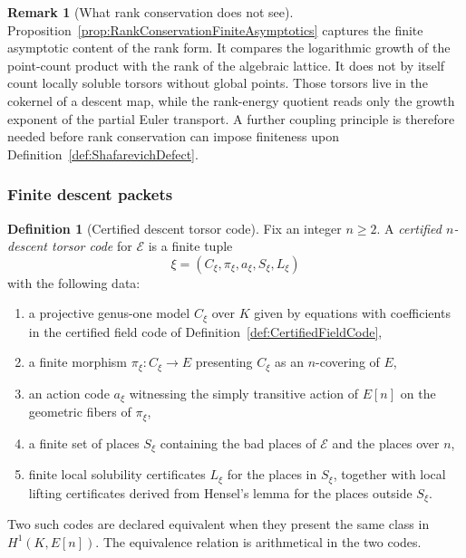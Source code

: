\documentclass[10pt, reqno]{amsart}
\theoremstyle{plain}
\theoremstyle{definition}
\newtheorem{definition}[theorem]{Definition}
\newtheorem{remark}[theorem]{Remark}
\theoremstyle{plain}
\begin{document}
\begin{remark}[What rank conservation does not see]
\label{rem:RankConservationDoesNotSeeSha}
Proposition~\ref{prop:RankConservationFiniteAsymptotics} captures the finite asymptotic content of the rank form. It compares the logarithmic growth of the point-count product with the rank of the algebraic lattice. It does not by itself count locally soluble torsors without global points. Those torsors live in the cokernel of a descent map, while the rank-energy quotient reads only the growth exponent of the partial Euler transport. A further coupling principle is therefore needed before rank conservation can impose finiteness upon Definition~\ref{def:ShafarevichDefect}.
\end{remark}

\subsubsection{Finite descent packets}
\label{subsubsec:FiniteDescentPackets}

\begin{definition}[Certified descent torsor code]
\label{def:CertifiedDescentTorsorCode}
Fix an integer $n\ge 2$. A \emph{certified $n$-descent torsor code} for $\mathcal{E}$ is a finite tuple
\[
  \xi=(C_{\xi},\pi_{\xi},a_{\xi},S_{\xi},L_{\xi})
\]
with the following data:
\begin{enumerate}
\item[(i)] a projective genus-one model $C_{\xi}$ over $K$ given by equations with coefficients in the certified field code of Definition~\ref{def:CertifiedFieldCode},
\item[(ii)] a finite morphism $\pi_{\xi}\colon C_{\xi}\to E$ presenting $C_{\xi}$ as an $n$-covering of $E$,
\item[(iii)] an action code $a_{\xi}$ witnessing the simply transitive action of $E[n]$ on the geometric fibers of $\pi_{\xi}$,
\item[(iv)] a finite set of places $S_{\xi}$ containing the bad places of $\mathcal{E}$ and the places over $n$,
\item[(v)] finite local solubility certificates $L_{\xi}$ for the places in $S_{\xi}$, together with local lifting certificates derived from Hensel's lemma for the places outside $S_{\xi}$.
\end{enumerate}
Two such codes are declared equivalent when they present the same class in $H^{1}(K,E[n])$. The equivalence relation is arithmetical in the two codes.
\end{definition}
\end{document}
